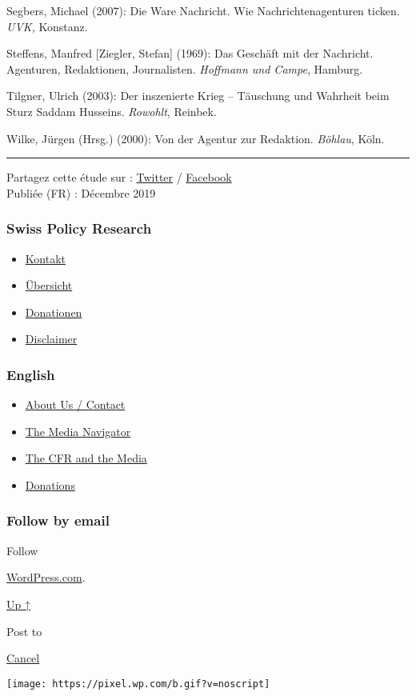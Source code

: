 Segbers, Michael (2007): Die Ware Nachricht. Wie Nachrichtenagenturen
ticken. \emph{UVK,} Konstanz.

Steffens, Manfred {[}Ziegler, Stefan{]} (1969): Das Geschäft mit der
Nachricht. Agenturen, Redaktionen, Journalisten. \emph{Hoffmann und
Campe}, Hamburg.

Tilgner, Ulrich (2003): Der inszenierte Krieg -- Täuschung und Wahrheit
beim Sturz Saddam Husseins. \emph{Rowohlt}, Reinbek.

Wilke, Jürgen (Hrsg.) (2000): Von der Agentur zur Redaktion.
\emph{Böhlau}, Köln.

\begin{center}\rule{0.5\linewidth}{\linethickness}\end{center}

Partagez cette étude sur :
\href{https://twitter.com/intent/tweet?url=https://swprs.org/le-multiplicateur-de-propagande/}{Twitter}
/
\href{https://www.facebook.com/share.php?u=https://swprs.org/le-multiplicateur-de-propagande/}{Facebook}\\
Publiée (FR) : Décembre 2019

\hypertarget{swiss-policy-research}{%
\subsubsection{Swiss Policy Research}\label{swiss-policy-research}}

\begin{itemize}
\tightlist
\item
  \href{https://swprs.org/kontakt/}{Kontakt}
\item
  \href{https://swprs.org/uebersicht/}{Übersicht}
\item
  \href{https://swprs.org/donationen/}{Donationen}
\item
  \href{https://swprs.org/disclaimer/}{Disclaimer}
\end{itemize}

\hypertarget{english}{%
\subsubsection{English}\label{english}}

\begin{itemize}
\tightlist
\item
  \href{https://swprs.org/contact/}{About Us / Contact}
\item
  \href{https://swprs.org/media-navigator/}{The Media Navigator}
\item
  \href{https://swprs.org/the-american-empire-and-its-media/}{The CFR
  and the Media}
\item
  \href{https://swprs.org/donations/}{Donations}
\end{itemize}

\hypertarget{follow-by-email}{%
\subsubsection{Follow by email}\label{follow-by-email}}

Follow

\href{https://wordpress.com/?ref=footer_custom_com}{WordPress.com}.

\protect\hyperlink{}{Up ↑}

Post to

\protect\hyperlink{}{Cancel}

\texttt{[image: https://pixel.wp.com/b.gif?v=noscript]}
